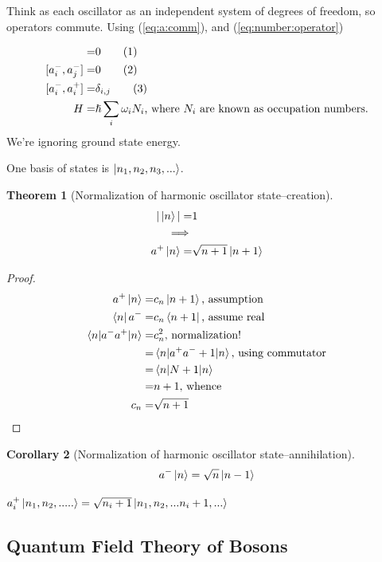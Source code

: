 \documentclass[]{article}
\newcommand\numberthis{\addtocounter{equation}{1}\tag{\theequation}}
\newtheorem{thm}{Theorem}
\newtheorem{cor}[thm]{Corollary}
\begin{document}
Think as each oscillator  as an independent system of degrees of freedom, so operators commute. Using  (\ref{eq:a:comm}), and (\ref{eq:number:operator})

\begin{align*}
[a^+_i,a^+_j] =& 0 \numberthis \label{eq:a:comm_i_plus}\\
[a^-_i,a^-_j] =& 0 \numberthis \label{eq:a:comm_i_minus}\\
[a^-_i,a^+_i] =& \delta_{i,j} \numberthis \label{eq:a:comm_i}\\
H =& \hslash \sum_{i}  \omega_i N_i\text{, where $N_i$ are known as occupation numbers.}
\end{align*}
We're ignoring ground state energy.

One basis of states is $\ket{n_1,n_2,n_3,...}$.

\begin{thm}[Normalization of harmonic oscillator state--creation]\label{thm:norm:harmonic}
	\begin{align*}
	|\ket{n}|=&1\\
	\implies&\\
	a^+\ket{n}=&\sqrt{n+1}\ket{n+1}
	\end{align*}
\end{thm} 

\begin{proof}
	\begin{align*}
	a^+\ket{n}=&c_n\ket{n+1} \text{, assumption}\\
	\bra{n}a^-=&c_n\bra{n+1}\text{, assume real}\\
	\braket{n|a^-a^+|n}=&c_n^2\text{, normalization!}\\
	=& \braket{n|a^+a^-+1|n}\text{, using commutator}\\
	=& \braket{n|N+1|n}\\
	=&n+1 \text{, whence}\\
	c_n=&\sqrt{n+1}
	\end{align*}
\end{proof}

\begin{cor}[Normalization of harmonic oscillator state--annihilation]
	\begin{align*}
	a^-\ket{n}=\sqrt{n}\ket{n-1}
	\end{align*}
\end{cor}


$a_i^+\ket{n_1,n_2,.....}=\sqrt{n_i+1}\ket{n_1,n_2,...n_i+1,...}$

\subsection{Quantum Field Theory of Bosons}
\end{document}

